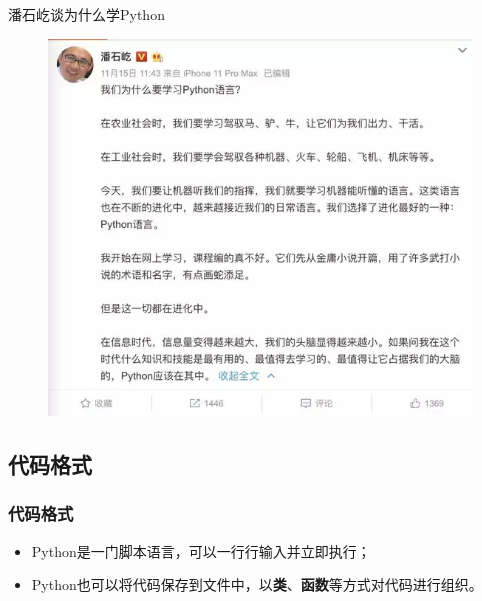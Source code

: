 \documentclass[11pt]{beamer}
\begin{document}
\begin{frame}{潘石屹谈为什么学Python}
	\begin{figure}
		\centering
		\includegraphics[width=0.6\linewidth]{figures/pythonPanshiyi02}
		\label{fig:pythonpanshiyi02}
	\end{figure}
\end{frame}

\subsection{代码格式}

\begin{frame}[fragile]
	\frametitle{代码格式}

	\begin{minipage}[t]{0.5\linewidth}
		\begin{itemize}
			\item Python是一门脚本语言，可以一行行输入并立即执行；
			\item Python也可以将代码保存到文件中，以\textbf{类}、\textbf{函数}等方式对代码进行组织。
		\end{itemize}
	\end{minipage}%
	\begin{minipage}[t]{0.05\linewidth}
		\quad
	\end{minipage}%
	\begin{minipage}[t]{0.4\linewidth}
		\begin{figure}
			
		\end{figure}
	\end{minipage}%
\end{frame}
\end{document}
